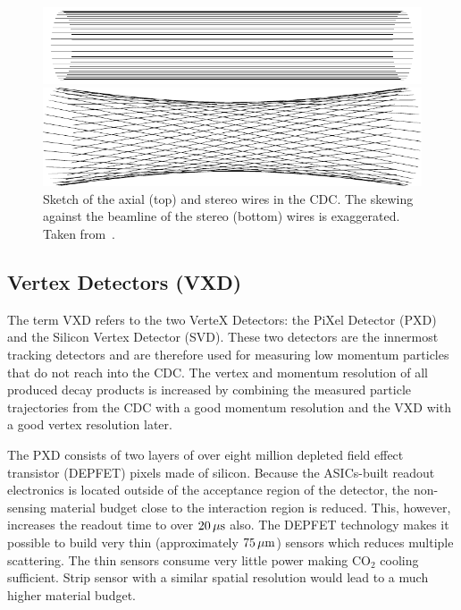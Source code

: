\begin{figure}
  \centering
  \includegraphics{figures/experimental_setup/axialLayers.pdf}
  
  \vspace*{1.5cm}
  
  \includegraphics{figures/experimental_setup/stereoLayers.pdf}
  \caption[Sketch of the axial (top) and stereo wires in the CDC.]{Sketch of the axial (top) and stereo wires in the CDC. The skewing against the beamline of the stereo (bottom) wires is exaggerated. Taken from~\cite{oliver}.}
  \label{fig-axial-stereo}
\end{figure}

\subsection{Vertex Detectors (VXD)}
The term VXD refers to the two VerteX Detectors: the PiXel Detector (PXD) and the Silicon Vertex Detector (SVD). These two detectors are the innermost tracking detectors and are therefore used for measuring low momentum particles that do not reach into the CDC. The vertex and momentum resolution of all produced decay products is increased by combining the measured particle trajectories from the CDC with a good momentum resolution and the VXD with a good vertex resolution later.

The PXD consists of two layers of over eight million depleted field effect transistor (DEPFET) pixels made of silicon. Because the ASICs-built readout electronics is located outside of the acceptance region of the detector, the non-sensing material budget close to the interaction region is reduced. This, however, increases the readout time to over $\unit[20]{\mu s}$ also. The DEPFET technology makes it possible to build very thin (approximately $\unit[75]{\mu m}$) sensors which reduces multiple scattering. The thin sensors consume very little power making $\mathrm{CO}_2$ cooling sufficient. Strip sensor with a similar spatial resolution would lead to a much higher material budget.

